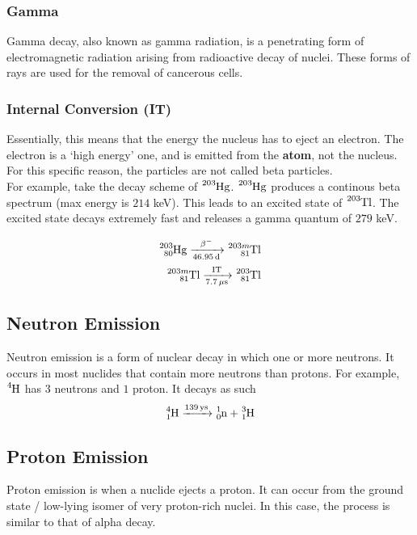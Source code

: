 \documentclass{article}
\begin{document}
\begin{multicols*}{2}
    \subsubsection{Gamma}
    Gamma decay, also known as gamma radiation, is a penetrating form of
    electromagnetic radiation arising from radioactive decay of nuclei. These
    forms of rays are used for the removal of cancerous cells.
    
    \subsubsection{Internal Conversion (IT)}
    Essentially, this means that the energy the nucleus has to eject an electron.
    The electron is a `high energy' one, and is emitted from the \textbf{atom},
    not the nucleus. For this specific reason, the particles are not called
    beta particles.\\

    For example, take the decay scheme of $\ce{^{203}Hg}$. $\ce{^{203}Hg}$ produces
    a continous beta spectrum (max energy is $214$ keV). This leads to an excited
    state of $\ce{^{203}Tl}$. The excited state decays extremely fast and releases
    a gamma quantum of $279$ keV.

    \begin{equation*}
      \begin{split}
        \ce{^{203}_{80}Hg ->[\beta^{-}][46.95 d] ^{203m}_{81}Tl} \\
        \ce{^{203m}_{81}Tl ->[IT][7.7 \mu{s}] ^{203}_{81}Tl} \\
      \end{split}
    \end{equation*}
    \subsection{Neutron Emission}
    Neutron emission is a form of nuclear decay in which one or more neutrons.
    It occurs in most nuclides that contain more neutrons than protons. For
    example, $\ce{^{4}H}$ has $3$ neutrons and $1$ proton. It decays as such
    \[
      \ce{^{4}_{1}H ->[139 ys] ^{1}_{0}n + ^{3}_{1}H}
    \]
    
    \subsection{Proton Emission}
    Proton emission is when a nuclide ejects a proton. It can occur from
    the ground state / low-lying isomer of very proton-rich nuclei. In
    this case, the process is similar to that of alpha decay.\\


\end{multicols*}
\end{document}
